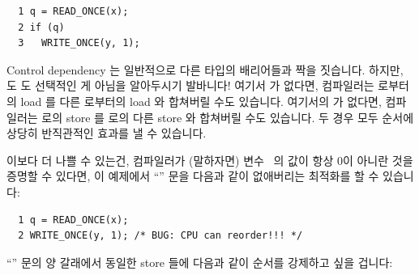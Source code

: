 \begin{enumerate}
\vspace{5pt}
\begin{minipage}[t]{\columnwidth}
\scriptsize
\begin{verbatim}
  1 q = READ_ONCE(x);
  2 if (q)
  3   WRITE_ONCE(y, 1);
\end{verbatim}
\end{minipage}
\vspace{5pt}

Control dependency 는 일반적으로 다른 타입의 배리어들과 짝을 짓습니다.
하지만,  도  도 선택적인 게 아님을 알아두시기
발바니다!
여기서  가 없다면, 컴파일러는  로부터의 load 를 다른
 로부터의 load 와 합쳐버릴 수도 있습니다.
여기서의  가 없다면, 컴파일러는  로의 store 를 
로의 다른 store 와 합쳐버릴 수도 있습니다.
두 경우 모두 순서에 상당히 반직관적인 효과를 낼 수 있습니다.

이보다 더 나쁠 수 있는건, 컴파일러가 (말하자면) 변수~ 의 값이 항상 0이
아니란 것을 증명할 수 있다면, 이 예제에서 ``'' 문을 다음과 같이
없애버리는 최적화를 할 수 있습니다:

\vspace{5pt}
\begin{minipage}[t]{\columnwidth}
\scriptsize
\begin{verbatim}
  1 q = READ_ONCE(x);
  2 WRITE_ONCE(y, 1); /* BUG: CPU can reorder!!! */
\end{verbatim}
\end{minipage}
\vspace{5pt}

``'' 문의 양 갈래에서 동일한 store 들에 다음과 같이 순서를 강제하고 싶을
겁니다:

\end{enumerate}
